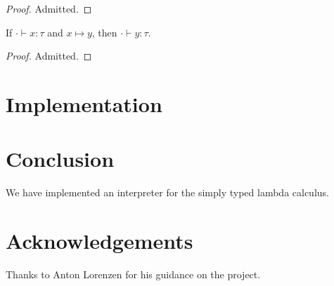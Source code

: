 \documentclass[]{acmart}
\begin{document}
  \begin{proof}
    Admitted.
  \end{proof}

  \begin{theorem}[Preservation]
    If $\cdot \vdash x : \tau$ and $x \mapsto y$, then $\cdot \vdash y : \tau$.
  \end{theorem}

  \begin{proof}
    Admitted.
  \end{proof}

  \section{Implementation}



  \section{Conclusion}

  We have implemented an interpreter for the simply typed lambda calculus.

  \section{Acknowledgements}

  Thanks to Anton Lorenzen for his guidance on the project.

  \printbibliography
\end{document}
